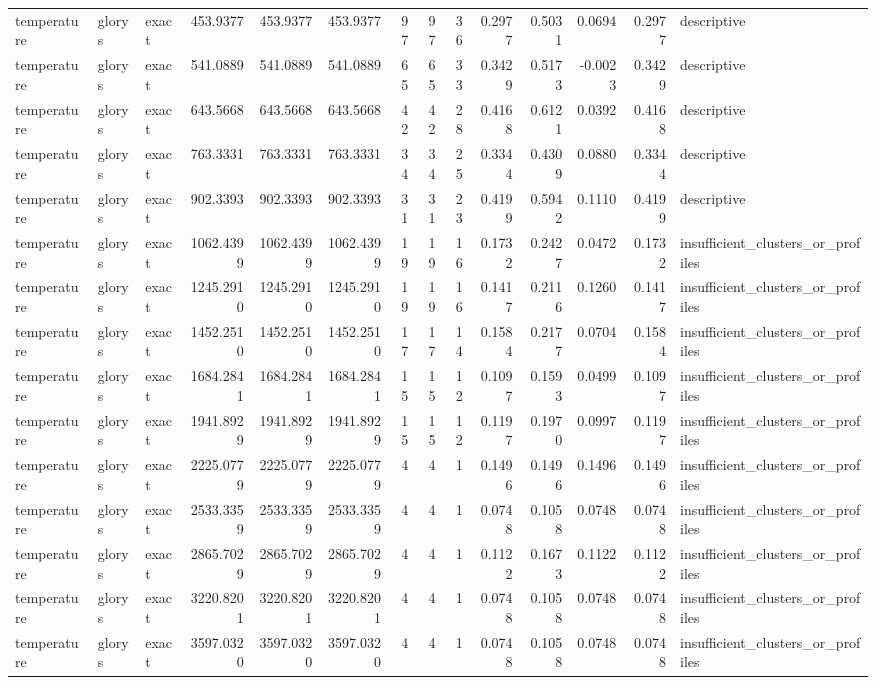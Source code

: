 \begin{tabular}{lllrrrrrrrrrrl}
temperature & glorys & exact & 453.9377 & 453.9377 & 453.9377 & 97 & 97 & 36 & 0.2977 & 0.5031 & 0.0694 & 0.2977 & descriptive \\
temperature & glorys & exact & 541.0889 & 541.0889 & 541.0889 & 65 & 65 & 33 & 0.3429 & 0.5173 & -0.0023 & 0.3429 & descriptive \\
temperature & glorys & exact & 643.5668 & 643.5668 & 643.5668 & 42 & 42 & 28 & 0.4168 & 0.6121 & 0.0392 & 0.4168 & descriptive \\
temperature & glorys & exact & 763.3331 & 763.3331 & 763.3331 & 34 & 34 & 25 & 0.3344 & 0.4309 & 0.0880 & 0.3344 & descriptive \\
temperature & glorys & exact & 902.3393 & 902.3393 & 902.3393 & 31 & 31 & 23 & 0.4199 & 0.5942 & 0.1110 & 0.4199 & descriptive \\
temperature & glorys & exact & 1062.4399 & 1062.4399 & 1062.4399 & 19 & 19 & 16 & 0.1732 & 0.2427 & 0.0472 & 0.1732 & insufficient_clusters_or_profiles \\
temperature & glorys & exact & 1245.2910 & 1245.2910 & 1245.2910 & 19 & 19 & 16 & 0.1417 & 0.2116 & 0.1260 & 0.1417 & insufficient_clusters_or_profiles \\
temperature & glorys & exact & 1452.2510 & 1452.2510 & 1452.2510 & 17 & 17 & 14 & 0.1584 & 0.2177 & 0.0704 & 0.1584 & insufficient_clusters_or_profiles \\
temperature & glorys & exact & 1684.2841 & 1684.2841 & 1684.2841 & 15 & 15 & 12 & 0.1097 & 0.1593 & 0.0499 & 0.1097 & insufficient_clusters_or_profiles \\
temperature & glorys & exact & 1941.8929 & 1941.8929 & 1941.8929 & 15 & 15 & 12 & 0.1197 & 0.1970 & 0.0997 & 0.1197 & insufficient_clusters_or_profiles \\
temperature & glorys & exact & 2225.0779 & 2225.0779 & 2225.0779 & 4 & 4 & 1 & 0.1496 & 0.1496 & 0.1496 & 0.1496 & insufficient_clusters_or_profiles \\
temperature & glorys & exact & 2533.3359 & 2533.3359 & 2533.3359 & 4 & 4 & 1 & 0.0748 & 0.1058 & 0.0748 & 0.0748 & insufficient_clusters_or_profiles \\
temperature & glorys & exact & 2865.7029 & 2865.7029 & 2865.7029 & 4 & 4 & 1 & 0.1122 & 0.1673 & 0.1122 & 0.1122 & insufficient_clusters_or_profiles \\
temperature & glorys & exact & 3220.8201 & 3220.8201 & 3220.8201 & 4 & 4 & 1 & 0.0748 & 0.1058 & 0.0748 & 0.0748 & insufficient_clusters_or_profiles \\
temperature & glorys & exact & 3597.0320 & 3597.0320 & 3597.0320 & 4 & 4 & 1 & 0.0748 & 0.1058 & 0.0748 & 0.0748 & insufficient_clusters_or_profiles \\

\end{tabular}
